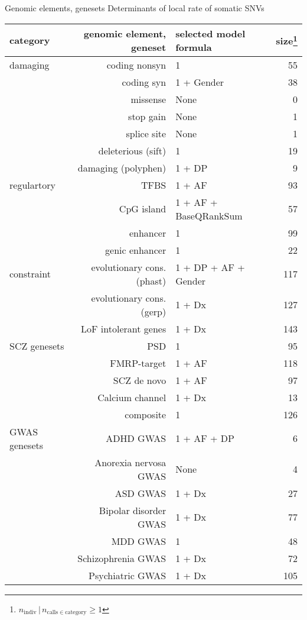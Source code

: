 \documentclass[usenames,dvipsnames]{beamer}
\begin{document}
\begin{frame}{Genomic elements, genesets}
	{Determinants of local rate of somatic SNVs}
\begin{center}
\tiny
\begin{tabular}{lrlr}
category & genomic element, geneset & selected model formula & size\footnote{\(n_\mathrm{indiv} \,|\, n_{\mathrm{calls} \in \mathrm{category}} \ge 1\)} \\
\hline
\hline
damaging & coding nonsyn & 1 & 55 \\
& coding syn & 1 + Gender & 38 \\
& missense & None & 0 \\
& stop gain & None & 1 \\
& splice site & None & 1 \\
& deleterious (sift) & 1 & 19 \\
& damaging (polyphen) & 1 + DP & 9 \\
\hline
regulartory & TFBS & 1 + AF & 93 \\
& CpG island & 1 + AF + BaseQRankSum & 57 \\
& enhancer & 1 & 99 \\
& genic enhancer & 1 & 22 \\
\hline
constraint & evolutionary cons. (phast) & 1 + DP + AF + Gender & 117 \\
& evolutionary cons. (gerp) & 1 + Dx & 127 \\
& LoF intolerant genes & 1 + Dx & 143 \\
\hline
SCZ genesets & PSD & 1 & 95 \\
& FMRP-target & 1 + AF & 118 \\
& SCZ de novo & 1 + AF & 97 \\
& Calcium channel & 1 + Dx & 13 \\
& composite & 1 & 126 \\
\hline
GWAS genesets & ADHD GWAS & 1 + AF + DP & 6 \\
& Anorexia nervosa GWAS & None & 4 \\
& ASD GWAS & 1 + Dx & 27 \\
& Bipolar disorder GWAS & 1 + Dx & 77 \\
& MDD GWAS & 1 & 48 \\
& Schizophrenia GWAS & 1 + Dx & 72 \\
& Psychiatric GWAS & 1 + Dx & 105 \\
\end{tabular}
\end{center}
\end{frame}
\end{document}
